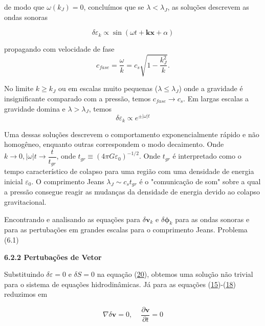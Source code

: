 \documentclass[a4paper,12pt]{article}
\begin{document}
de modo que $\omega (k_J) = 0$, concluímos que se $\lambda < \lambda_J$, as soluções descrevem as ondas sonoras

\begin{equation}\label{eq25}
	\delta\varepsilon_k \propto \sin (\omega t + \mathbf{k}\mathbf{x} + \alpha)
\end{equation}

propagando com velocidade de fase
\begin{equation}\label{eq26}
 	c_{fase} = \dfrac{\omega}{k}= c_s\sqrt{1 - \dfrac{k^2_J}{k}}.
\end{equation}

No limite $k \geq k_J$ ou em escalas muito pequenas ($\lambda \leq \lambda_J$) onde a gravidade é insignificante comparado com a pressão, temos $c_{fase} \to c_s$.
Em largas escalas a gravidade domina e $\lambda > \lambda_J$, temos
\begin{equation}\label{eq27}
	\delta\varepsilon_k \propto e^{\pm |\omega| t }
\end{equation}

 Uma dessas soluções descrevem o comportamento exponencialmente rápido e não homogêneo, enquanto outras correspondem o modo decaimento. Onde $k \to 0, |\omega | t \to \dfrac{t}{t_{gr}}$, onde $t_{gr} \equiv (4\pi G\varepsilon_0)^{-1/2}$. Onde $t_{gr}$ é interpretado como o tempo característico de colapso para uma região com uma densidade de energia inicial $\varepsilon_0$.
 O comprimento Jeans $\lambda_J \sim c_s t_{gr} $ é o "comunicação de som" sobre a qual a pressão consegue reagir as mudanças da densidade de energia devido ao colapso gravitacional.
 
 Encontrando e analisando as equações para $\delta\mathbf{v}_k$ e $\delta\mathbf{\phi}_k$ para as ondas sonoras e para as pertubações em grandes escalas para o comprimento Jeans.  Problema (6.1)
 
 \begin{center}
 	\textbf{6.2.2 Pertubações de Vetor}
 \end{center}
 Substituindo $\delta\varepsilon = 0$ e $\delta S = 0$ na equação (\hyperref[eq20]{20}), obtemos uma solução não trivial para o sistema de equações hidrodinâmicas. Já para as equações (\hyperref[eq15]{15})-(\hyperref[eq18]{18}) reduzimos em
 
 \begin{equation}\label{eq28}
 	\nabla \delta\mathbf{v} = 0 ,\,\,\,\,\,\,\, \dfrac{\partial \mathbf{v}}{\partial t} = 0
 \end{equation}
\end{document}
